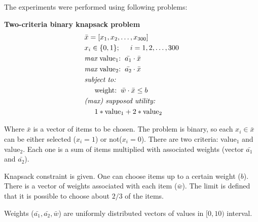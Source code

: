 The experiments were performed using following problems:
\begin{description}
  \item{\textbf{Two-criteria binary knapsack problem}}
    \begin{align*}
      & \bar{x} = [x_1, x_2, \dots, x_{300}]  \\
      & x_i \in \{0, 1\};  \hspace{0.5cm} i = 1, 2, \dots, 300 \\
      & \textit{max}\text{ value$_1$:} \hspace{0.2cm} \bar{a_1} \cdot \bar{x} \\
      & \textit{max}\text{ value$_2$:} \hspace{0.2cm} \bar{a_2} \cdot \bar{x} \\
      & \textit{subject to:} \\
      & \hspace{0.5cm} \text{weight:} \hspace{0.2cm} \bar{w} \cdot \bar{x}
      \leq b \\
      & \textit{(max) supposed utility:} \\
      & \hspace{0.5cm} 1*\text{value}_1 + 2*\text{value}_2
    \end{align*}
    
    Where $\bar{x}$ is a vector of items to be chosen. The problem is binary,
    so each $x_i \in \bar{x}$ can be either selected ($x_i = 1$) or not($x_i
    = 0$). There are two criteria: value$_1$ and value$_2$. Each one is a sum
    of items multiplied with associated weights (vector $\bar{a_1}$ and
    $\bar{a_2}$).

    Knapsack constraint is given. One can choose items up to a certain weight
    ($b$). There is a vector of weights associated with each item
    ($\bar{w}$). The limit is defined that it is possible to choose about
    $2/3$ of the items.

    Weights ($\bar{a_1}, \bar{a_2}, \bar{w}$) are uniformly distributed
    vectors of values in $[0,10)$ interval.



\end{description}
